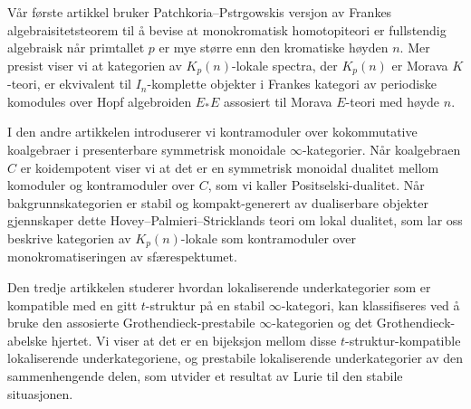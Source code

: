 Vår første artikkel bruker Patchkoria--Pstr\a{}gowskis versjon av Frankes algebraisitetsteorem til å bevise at monokromatisk homotopiteori er fullstendig algebraisk når primtallet $p$ er mye større enn den kromatiske høyden $n$. Mer presist viser vi at kategorien av $K_p(n)$-lokale spectra, der $K_p(n)$ er Morava $K$-teori, er ekvivalent til $I_n$-komplette objekter i Frankes kategori av periodiske komodules over Hopf algebroiden $E_*E$ assosiert til Morava $E$-teori med høyde $n$. 

I den andre artikkelen introduserer vi kontramoduler over kokommutative koalgebraer i presenterbare symmetrisk monoidale $\infty$-kategorier. Når koalgebraen $C$ er koidempotent viser vi at det er en symmetrisk monoidal dualitet mellom komoduler og kontramoduler over $C$, som vi kaller Positselski-dualitet. Når bakgrunnskategorien er stabil og kompakt-generert av dualiserbare objekter gjennskaper dette Hovey--Palmieri--Stricklands teori om lokal dualitet, som lar oss beskrive kategorien av $K_p(n)$-lokale som kontramoduler over monokromatiseringen av sfærespektumet. 

Den tredje artikkelen studerer hvordan lokaliserende underkategorier som er kompatible med en gitt $t$-struktur på en stabil $\infty$-kategori, kan klassifiseres ved å bruke den assosierte Grothendieck-prestabile $\infty$-kategorien og det Grothendieck-abelske hjertet. Vi viser at det er en bijeksjon mellom disse $t$-struktur-kompatible lokaliserende underkategoriene, og prestabile lokaliserende underkategorier av den sammenhengende delen, som utvider et resultat av Lurie til den stabile situasjonen. 


